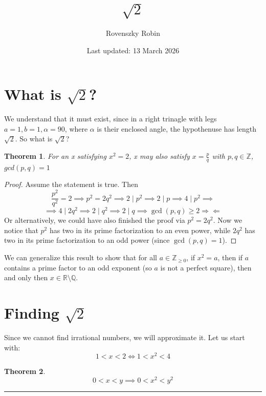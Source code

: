 \documentclass{article}
\title{$\sqrt{2}$}
\author{Rovenszky Robin}
\date{Last updated: 13 March 2026}
\newtheorem{theorem}{Theorem}
\begin{document}
\maketitle

\section{What is $\sqrt{2}$?}
We understand that it must exist, since in a right trinagle with legs $a = 1, b= 1, \alpha = 90$, where $\alpha$ is their enclosed angle, the hypothenuse has length $\sqrt{2}$. So what is $\sqrt{2}$?
\\
\begin{theorem}
    For an x satisfying $x^2 = 2$, x may also satisfy $x = \frac{p}{q}$ with $p, q \in \mathbb{Z}$, $gcd(p, q) = 1$
\end{theorem}
\begin{proof}
    Assume the statement is true. Then
    \begin{equation}
        \frac{p^2}{q^2} = 2 \implies p^2 = 2q^2 \implies 2 \mid p^2 \implies 2 \mid p \implies 4 \mid p^2 \implies
    \end{equation}
    \begin{equation}
        \implies 4 \mid 2q^2 \implies 2 \mid q^2 \implies 2 \mid q \implies \gcd(p, q) \ge 2 \Rightarrow\!\Leftarrow
    \end{equation}
    Or alternatively, we could have also finished the proof via
    $p^2 = 2q^2$. Now we notice that $p^2$ has two in its prime factorization to an even power, while $2q^2$ has two in its prime factorization to an odd power (since $\gcd(p,q) = 1$).
\end{proof}

We can generalize this result to show that for all $a \in \mathbb{Z}_{\ge 0}$, if $x^2 = a$, then if $a$ contains a prime factor to an odd exponent (so $a$ is not a perfect square), then and only then $x \in \mathbb{R} \setminus \mathbb{Q}$.

\section{Finding $\sqrt{2}$}
Since we cannot find irrational numbers, we will approximate it. Let us start with:
\[
1 < x < 2 \Leftrightarrow 1 < x^2 < 4
\]
\begin{theorem}
    \[
    0 < x < y \implies 0 < x^2 < y^2
    \]
\end{theorem}
\hrule
\vspace{1em}
\end{document}
